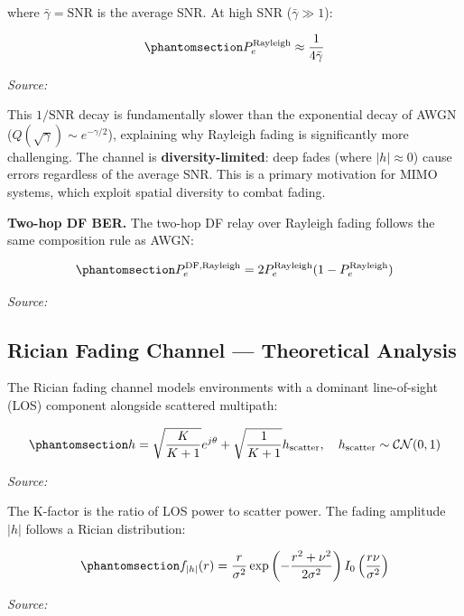 where \(\bar{\gamma} = \text{SNR}\) is the average SNR. At high SNR (\(\bar{\gamma} \gg 1\)):

\begin{equation}\protect\phantomsection\label{eq:rayleigh-ber-approx}{P_e^{\text{Rayleigh}} \approx \frac{1}{4\bar{\gamma}}
}\end{equation} \par{\small\textit{Source: \cite{proakis2008digital}}}

This \(1/\text{SNR}\) decay is fundamentally slower than the exponential decay of AWGN (\(Q(\sqrt{\gamma}) \sim e^{-\gamma/2}\)), explaining why Rayleigh fading is significantly more challenging. The channel is \textbf{diversity-limited}: deep fades (where \(|h| \approx 0\)) cause errors regardless of the average SNR. This is a primary motivation for MIMO systems, which exploit spatial diversity to combat fading.

\textbf{Two-hop DF BER.} The two-hop DF relay over Rayleigh fading follows the same composition rule as AWGN:

\begin{equation}\protect\phantomsection\label{eq:df-ber-rayleigh}{P_e^{\text{DF,Rayleigh}} = 2P_e^{\text{Rayleigh}}(1 - P_e^{\text{Rayleigh}})
}\end{equation} \par{\small\textit{Source: \cite{laneman2004cooperative}}}


\subsection{Rician Fading Channel --- Theoretical Analysis}\label{sec:rician-fading-channel-theoretical-analysis}

The Rician fading channel models environments with a dominant line-of-sight (LOS) component alongside scattered multipath:

\begin{equation}\protect\phantomsection\label{eq:rician-channel}{h = \sqrt{\frac{K}{K+1}} e^{j\theta} + \sqrt{\frac{1}{K+1}} h_{\text{scatter}}, \quad h_{\text{scatter}} \sim \mathcal{CN}(0, 1)
}\end{equation} \par{\small\textit{Source: \cite{simon2005digital}}}

The K-factor is the ratio of LOS power to scatter power. The fading amplitude \(|h|\) follows a Rician distribution:

\begin{equation}\protect\phantomsection\label{eq:rician-pdf}{f_{|h|}(r) = \frac{r}{\sigma^2} \exp\left(-\frac{r^2 + \nu^2}{2\sigma^2}\right) I_0\left(\frac{r\nu}{\sigma^2}\right)
}\end{equation} \par{\small\textit{Source: \cite{simon2005digital}}}

